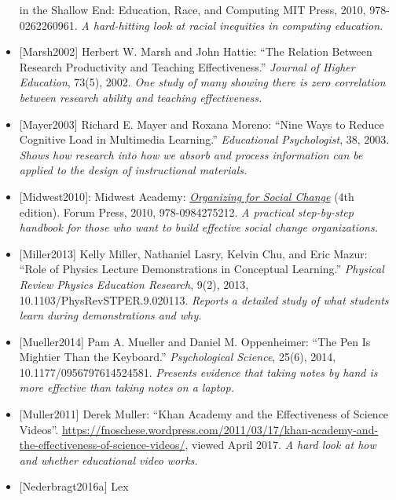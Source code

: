 \documentclass[10pt,statementpaper]{memoir}
\begin{document}
\begin{itemize}
{{  in the Shallow End: Education, Race, and Computing}} MIT Press, 2010,
  978-0262260961. \emph{A hard-hitting look at racial inequities in
  computing education.}
\item
  \protect\hypertarget{marsh-hattie-teaching}{}{{[}Marsh2002{]}} Herbert
  W. Marsh and John Hattie: ``The Relation Between Research Productivity
  and Teaching Effectiveness.'' \emph{Journal of Higher Education},
  73(5), 2002. \emph{One study of many showing there is zero correlation
  between research ability and teaching effectiveness.}
\item
  \protect\hypertarget{mayer-nine-ways}{}{{[}Mayer2003{]}} Richard E.
  Mayer and Roxana Moreno: ``Nine Ways to Reduce Cognitive Load in
  Multimedia Learning.'' \emph{Educational Psychologist}, 38, 2003.
  \emph{Shows how research into how we absorb and process information
  can be applied to the design of instructional materials.}
\item
  \protect\hypertarget{midwest-organizing}{}{{[}Midwest2010{]}}:
  {Midwest Academy:
  \emph{\href{https://www.amazon.com/Organizing-Social-Change-Bobo-Kendall/dp/0984275215/}{Organizing
  for Social Change}} (4th edition). Forum Press, 2010, 978-0984275212.
  \emph{A practical step-by-step handbook for those who want to build
  effective social change organizations.}}
\item
  \protect\hypertarget{miller-predictions}{}{{[}Miller2013{]}} Kelly
  Miller, Nathaniel Lasry, Kelvin Chu, and Eric Mazur: ``Role of Physics
  Lecture Demonstrations in Conceptual Learning.'' \emph{Physical Review
  Physics Education Research}, 9(2), 2013,
  10.1103/PhysRevSTPER.9.020113. \emph{Reports a detailed study of what
  students learn during demonstrations and why.}
\item
  \protect\hypertarget{mueller-note-taking}{}{{[}Mueller2014{]}} Pam A.
  Mueller and Daniel M. Oppenheimer: ``The Pen Is Mightier Than the
  Keyboard.'' \emph{Psychological Science}, 25(6), 2014,
  10.1177/0956797614524581. \emph{Presents evidence that taking notes by
  hand is more effective than taking notes on a laptop.}
\item
  \protect\hypertarget{muller-videos}{}{{[}Muller2011{]}} Derek Muller:
  ``Khan Academy and the Effectiveness of Science Videos''.
  \url{https://fnoschese.wordpress.com/2011/03/17/khan-academy-and-the-effectiveness-of-science-videos/},
  viewed April 2017. \emph{A hard look at how and whether educational
  video works.}
\item
  \protect\hypertarget{live-coding-bad}{}{{[}Nederbragt2016a{]}} Lex

\end{itemize}
\end{document}
